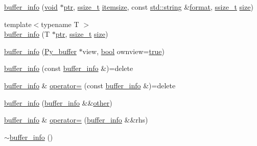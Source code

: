 \begin{DoxyCompactItemize}
\item 
\mbox{\hyperlink{structbuffer__info_a4fcc193bf8c8693624eb20586471ca85}{buffer\+\_\+info}} (\mbox{\hyperlink{_s_d_l__opengles2__gl2ext_8h_ae5d8fa23ad07c48bb609509eae494c95}{void}} $\ast$\mbox{\hyperlink{structbuffer__info_a2976ad4b157156ebbcffe667888e2d28}{ptr}}, \mbox{\hyperlink{detail_2common_8h_ac430d16fc097b3bf0a7469cfd09decda}{ssize\+\_\+t}} \mbox{\hyperlink{structbuffer__info_a8a95447f854c217a3b76168627900139}{itemsize}}, const \mbox{\hyperlink{_s_d_l__opengl__glext_8h_ab4ccfaa8ab0e1afaae94dc96ef52dde1}{std\+::string}} \&\mbox{\hyperlink{_s_d_l__audio_8h_a71a65ffd977afe9c3fef116a5bc9ee27}{format}}, \mbox{\hyperlink{detail_2common_8h_ac430d16fc097b3bf0a7469cfd09decda}{ssize\+\_\+t}} \mbox{\hyperlink{_s_d_l__opengl__glext_8h_a3d1e3edfcf61ca2d831883e1afbad89e}{size}})
\item 
{\footnotesize template$<$typename T $>$ }\\\mbox{\hyperlink{structbuffer__info_afdadf4414d716e34b64a215014fc2dfb}{buffer\+\_\+info}} (T $\ast$\mbox{\hyperlink{structbuffer__info_a2976ad4b157156ebbcffe667888e2d28}{ptr}}, \mbox{\hyperlink{detail_2common_8h_ac430d16fc097b3bf0a7469cfd09decda}{ssize\+\_\+t}} \mbox{\hyperlink{_s_d_l__opengl__glext_8h_a3d1e3edfcf61ca2d831883e1afbad89e}{size}})
\item 
\mbox{\hyperlink{structbuffer__info_a18bf6023b6d4bb685d345d5acb9b71ca}{buffer\+\_\+info}} (\mbox{\hyperlink{_python27_2object_8h_a0c1c5dc66cfb07c46b863b5186f61cf4}{Py\+\_\+buffer}} $\ast$view, \mbox{\hyperlink{asdl_8h_af6a258d8f3ee5206d682d799316314b1}{bool}} ownview=\mbox{\hyperlink{asdl_8h_af6a258d8f3ee5206d682d799316314b1a08f175a5505a10b9ed657defeb050e4b}{true}})
\item 
\mbox{\hyperlink{structbuffer__info_a7c5a7e3878ecda87f0e60448b2bf7d1e}{buffer\+\_\+info}} (const \mbox{\hyperlink{structbuffer__info}{buffer\+\_\+info}} \&)=delete
\item 
\mbox{\hyperlink{structbuffer__info}{buffer\+\_\+info}} \& \mbox{\hyperlink{structbuffer__info_ab55caff9667d44d8ffec6822c4a09068}{operator=}} (const \mbox{\hyperlink{structbuffer__info}{buffer\+\_\+info}} \&)=delete
\item 
\mbox{\hyperlink{structbuffer__info_a6ea2c0767021b4dc20c6116b6989c3aa}{buffer\+\_\+info}} (\mbox{\hyperlink{structbuffer__info}{buffer\+\_\+info}} \&\&\mbox{\hyperlink{dictobject_8h_abd4733e17e86acb453bda62bc8b96adf}{other}})
\item 
\mbox{\hyperlink{structbuffer__info}{buffer\+\_\+info}} \& \mbox{\hyperlink{structbuffer__info_a21fc6598b9a1e8df410d1168971a2208}{operator=}} (\mbox{\hyperlink{structbuffer__info}{buffer\+\_\+info}} \&\&rhs)
\item 
\mbox{\hyperlink{structbuffer__info_af1f9a46bb7b88c2ff00001b68d21cded}{$\sim$buffer\+\_\+info}} ()
\end{DoxyCompactItemize}
